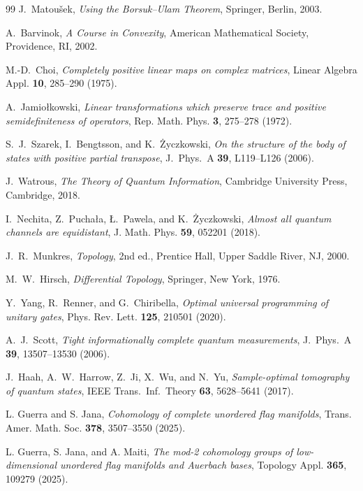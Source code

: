 \documentclass[11pt,a4paper]{article}
\theoremstyle{definition}
\theoremstyle{plain}
\theoremstyle{remark}
\begin{document}
\begin{thebibliography}{99}
J.~Matou\v{s}ek,
\emph{Using the Borsuk--Ulam Theorem},
Springer, Berlin, 2003.

A.~Barvinok,
\emph{A Course in Convexity},
American Mathematical Society, Providence, RI, 2002.

M.-D.~Choi,
\emph{Completely positive linear maps on complex matrices},
Linear Algebra Appl. \textbf{10}, 285--290 (1975).

A.~Jamio\l{}kowski,
\emph{Linear transformations which preserve trace and positive
semidefiniteness of operators},
Rep. Math. Phys. \textbf{3}, 275--278 (1972).

S.~J.~Szarek, I.~Bengtsson, and K.~\.{Z}yczkowski,
\emph{On the structure of the body of states with positive partial transpose},
J.~Phys.~A \textbf{39}, L119--L126 (2006).

J.~Watrous,
\emph{The Theory of Quantum Information},
Cambridge University Press, Cambridge, 2018.

I.~Nechita, Z.~Pucha\l{}a, \L.~Pawela, and K.~\.{Z}yczkowski,
\emph{Almost all quantum channels are equidistant},
J. Math. Phys. \textbf{59}, 052201 (2018).

J.~R.~Munkres,
\emph{Topology}, 2nd ed.,
Prentice Hall, Upper Saddle River, NJ, 2000.

M.~W.~Hirsch,
\emph{Differential Topology},
Springer, New York, 1976.

Y.~Yang, R.~Renner, and G.~Chiribella,
\emph{Optimal universal programming of unitary gates},
Phys. Rev. Lett. \textbf{125}, 210501 (2020).

A.~J.~Scott,
\emph{Tight informationally complete quantum measurements},
J.~Phys.~A \textbf{39}, 13507--13530 (2006).

J.~Haah, A.~W.~Harrow, Z.~Ji, X.~Wu, and N.~Yu,
\emph{Sample-optimal tomography of quantum states},
IEEE Trans.~Inf.~Theory \textbf{63}, 5628--5641 (2017).

L. Guerra and S. Jana, \emph{Cohomology of complete unordered flag manifolds},
Trans. Amer. Math. Soc. \textbf{378}, 3507--3550 (2025).

L. Guerra, S. Jana, and A. Maiti, \emph{The mod-2 cohomology groups of
low-dimensional unordered flag manifolds and Auerbach bases},
Topology Appl. \textbf{365}, 109279 (2025).

\end{thebibliography}
\end{document}

